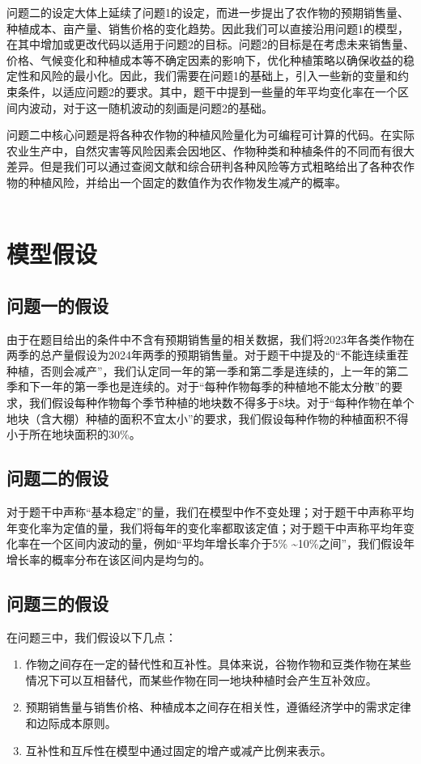 \documentclass[withoutpreface]{cumcmthesis}
\begin{document}
问题二的设定大体上延续了问题1的设定，而进一步提出了农作物的预期销售量、种植成本、亩产量、销售价格的变化趋势。因此我们可以直接沿用问题1的模型，在其中增加或更改代码以适用于问题2的目标。问题2的目标是在考虑未来销售量、价格、气候变化和种植成本等不确定因素的影响下，优化种植策略以确保收益的稳定性和风险的最小化。因此，我们需要在问题1的基础上，引入一些新的变量和约束条件，以适应问题2的要求。其中，题干中提到一些量的年平均变化率在一个区间内波动，对于这一随机波动的刻画是问题2的基础。

问题二中核心问题是将各种农作物的种植风险量化为可编程可计算的代码。在实际农业生产中，自然灾害等风险因素会因地区、作物种类和种植条件的不同而有很大差异。但是我们可以通过查阅文献和综合研判各种风险等方式粗略给出了各种农作物的种植风险，并给出一个固定的数值作为农作物发生减产的概率。\\\\


\newpage
\section{模型假设}
\subsection{问题一的假设}
由于在题目给出的条件中不含有预期销售量的相关数据，我们将2023年各类作物在两季的总产量假设为2024年两季的预期销售量。对于题干中提及的“不能连续重茬种植，否则会减产”，我们认定同一年的第一季和第二季是连续的，上一年的第二季和下一年的第一季也是连续的。对于“每种作物每季的种植地不能太分散”的要求，我们假设每种作物每个季节种植的地块数不得多于8块。对于“每种作物在单个地块（含大棚）种植的面积不宜太小”的要求，我们假设每种作物的种植面积不得小于所在地块面积的30\%。
\subsection{问题二的假设}
对于题干中声称“基本稳定”的量，我们在模型中作不变处理；对于题干中声称平均年变化率为定值的量，我们将每年的变化率都取该定值；对于题干中声称平均年变化率在一个区间内波动的量，例如“平均年增长率介于5\% \textasciitilde 10\%之间”，我们假设年增长率的概率分布在该区间内是均匀的。
\subsection{问题三的假设}
在问题三中，我们假设以下几点：
\begin{enumerate}
    \item 作物之间存在一定的替代性和互补性。具体来说，谷物作物和豆类作物在某些情况下可以互相替代，而某些作物在同一地块种植时会产生互补效应。
    \item 预期销售量与销售价格、种植成本之间存在相关性，遵循经济学中的需求定律和边际成本原则。
    \item 互补性和互斥性在模型中通过固定的增产或减产比例来表示。
\end{enumerate}
\end{document}
